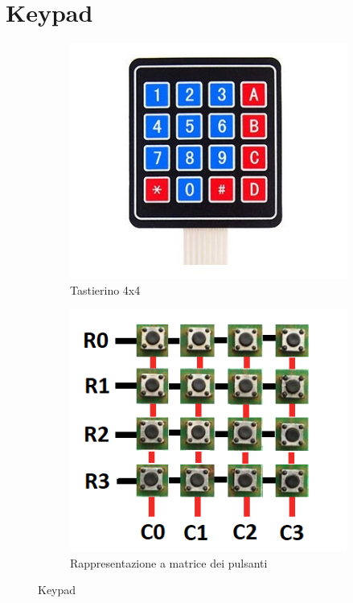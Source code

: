 \documentclass[12pt]{report}
\begin{document}
%
\section{Keypad}
%

\begin{figure}
	\centering
	\begin{subfigure}{.5\textwidth}
		\centering
		\includegraphics[width=0.8\linewidth]{./img/keypad.jpg}
		\caption{Tastierino 4x4}
		\label{fig:keypad}
	\end{subfigure}%
	\begin{subfigure}{.5\textwidth}
		\centering
		\includegraphics[width=0.78\linewidth]{./img/keypad_matrix.png}
		\caption{Rappresentazione a matrice dei pulsanti}
		\label{fig:keypad_matrix}
	\end{subfigure}
	\caption{Keypad}
	\label{fig:keypad_both}
\end{figure}
\end{document}
